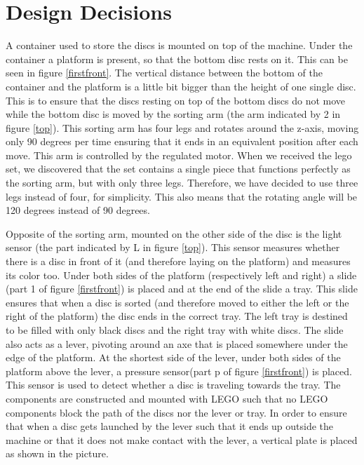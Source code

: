 \documentclass[a4paper,oneside,11pt]{article}
\begin{document}
\section{Design Decisions}
A container used to store the discs is mounted on top of the machine. Under the container a platform is present, so that the bottom disc rests on it. This can be seen in figure \ref{firstfront}. The vertical distance between the bottom of the container and the platform is a little bit bigger than the height of one single disc. This is to ensure that the discs resting on top of the bottom discs do not move while the bottom disc is moved by the sorting arm (the arm indicated by 2 in figure \ref{top}). This sorting arm has four legs and rotates around the z-­axis, moving only 90 degrees per time ensuring that it ends in an equivalent position after each move. This arm is controlled by the regulated motor. When we received the lego set, we discovered that the set contains a single piece that functions perfectly as the sorting arm, but with only three legs. Therefore, we have decided to use three legs instead of four, for simplicity. This also means that the rotating angle will be 120 degrees instead of 90 degrees. 

Opposite of the sorting arm, mounted on the other side of the disc is the light sensor (the part indicated by L in figure \ref{top}). This sensor measures whether there is a disc in front of it (and therefore laying on the platform) and measures its color too. Under both sides of the platform (respectively left and right) a slide (part 1 of figure \ref{firstfront}) is placed and at the end of the slide a tray. This slide ensures that when a disc is sorted (and therefore moved to either the left or the right of the platform) the disc ends in the correct tray. The left tray is destined to be filled with only black discs and the right tray with white discs. The slide also acts as a lever, pivoting around an axe that is placed somewhere under the edge of the platform. At the shortest side of the lever, under both sides of the platform above the lever, a pressure sensor(part p of figure \ref{firstfront}) is placed. This sensor is used to detect whether a disc is traveling towards the tray. The components are constructed and mounted with LEGO such that no LEGO components block the path of the discs nor the lever or tray. In order to ensure that when a disc gets launched by the lever such that it ends up outside the machine or that it does not make contact with the lever, a vertical plate is placed as shown in the picture.
\end{document}
